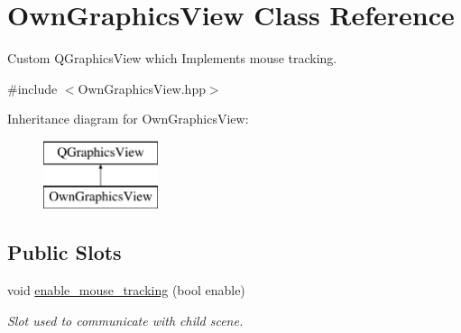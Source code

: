 \hypertarget{classOwnGraphicsView}{}\section{Own\+Graphics\+View Class Reference}
\label{classOwnGraphicsView}


Custom Q\+Graphics\+View which Implements mouse tracking.  




{\ttfamily \#include $<$Own\+Graphics\+View.\+hpp$>$}

Inheritance diagram for Own\+Graphics\+View\+:\begin{figure}[H]
\begin{center}
\leavevmode
\includegraphics[height=2.000000cm]{classOwnGraphicsView}
\end{center}
\end{figure}
\subsection*{Public Slots}
\begin{DoxyCompactItemize}
\item 
void \mbox{\hyperlink{classOwnGraphicsView_a4902ca3c748bc13040c4d869bf7be291}{enable\+\_\+mouse\+\_\+tracking}} (bool enable)
\begin{DoxyCompactList}\small\item\em Slot used to communicate with child scene. \end{DoxyCompactList}\end{DoxyCompactItemize}
